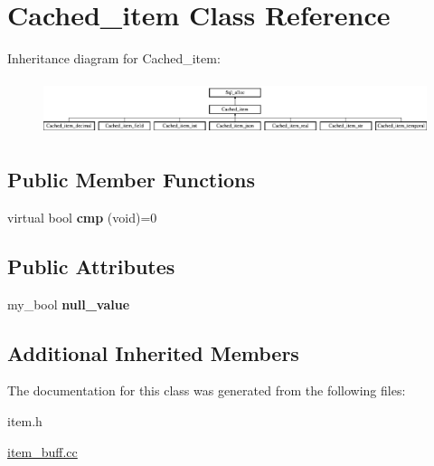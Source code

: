 \hypertarget{classCached__item}{}\section{Cached\+\_\+item Class Reference}
\label{classCached__item}
Inheritance diagram for Cached\+\_\+item\+:\begin{figure}[H]
\begin{center}
\leavevmode
\includegraphics[height=1.621622cm]{classCached__item}
\end{center}
\end{figure}
\subsection*{Public Member Functions}
\begin{DoxyCompactItemize}
\item 
\mbox{\label{classCached__item_a9375c7f70ee51b5f4963d1135542dd23}} 
virtual bool {\bfseries cmp} (void)=0
\end{DoxyCompactItemize}
\subsection*{Public Attributes}
\begin{DoxyCompactItemize}
\item 
\mbox{\label{classCached__item_a27a39c758ce36ab5eb8c45ae1830896a}} 
my\+\_\+bool {\bfseries null\+\_\+value}
\end{DoxyCompactItemize}
\subsection*{Additional Inherited Members}


The documentation for this class was generated from the following files\+:\begin{DoxyCompactItemize}
\item 
item.\+h\item 
\mbox{\hyperlink{item__buff_8cc}{item\+\_\+buff.\+cc}}\end{DoxyCompactItemize}
